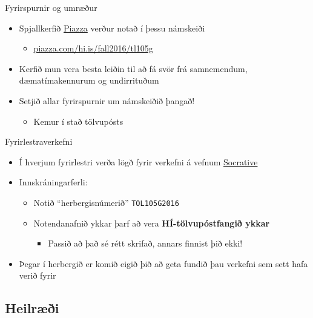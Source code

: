 \documentclass[handout]{beamer}
\begin{document}
\begin{frame}{Fyrirspurnir og umræður}
\label{frame:piazza}
\begin{itemize}
 \item Spjallkerfið \href{piazza.com/hi.is/fall2016/tl105g}{Piazza} verður notað í þessu námskeiði
 \begin{itemize}
  \item \url{piazza.com/hi.is/fall2016/tl105g}
 \end{itemize}
 \item Kerfið mun vera besta leiðin til að fá svör frá samnemendum, dæmatímakennurum og undirrituðum
 \item Setjið allar fyrirspurnir um námskeiðið þangað!
 \begin{itemize}
  \item Kemur í stað tölvupósts
 \end{itemize}
\end{itemize}
\end{frame}

\begin{frame}{Fyrirlestraverkefni}
\begin{itemize}
 \item Í hverjum fyrirlestri verða lögð fyrir verkefni á vefnum \href{http://socrative.com/}{Socrative}
 \item Innskráningarferli:
 \begin{itemize}
  \item Notið ``herbergisnúmerið'' \texttt{TOL105G2016}
  \item Notendanafnið ykkar þarf að vera \textbf{HÍ-tölvupóstfangið ykkar}
  \begin{itemize}
   \item Passið að það sé rétt skrifað, annars finnist þið ekki!
  \end{itemize}
 \end{itemize}
 \item Þegar í herbergið er komið eigið þið að geta fundið þau verkefni sem sett hafa verið fyrir
\end{itemize}
\end{frame}

\subsection{Heilræði}
\end{document}
